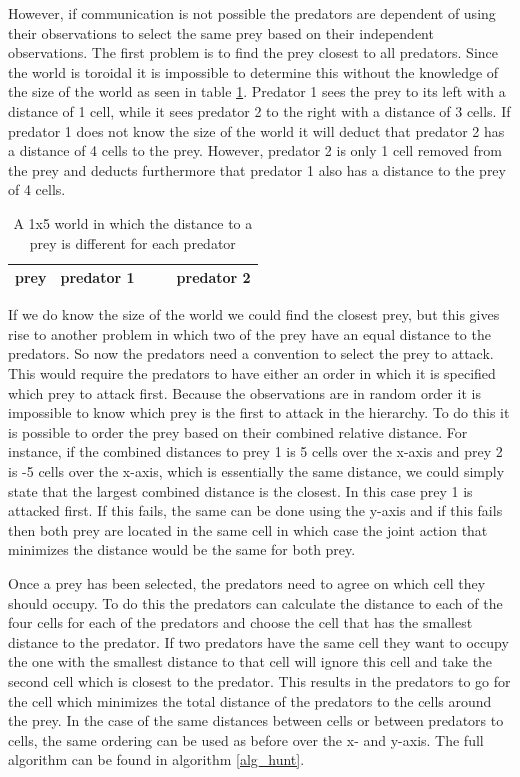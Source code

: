 \documentclass[10pt]{article}
\begin{document}
However, if communication is not possible the predators are dependent of using their observations to select the same prey based on their independent observations. The first problem is to find the prey closest to all predators. Since the world is toroidal it is impossible to determine this without the knowledge of the size of the world as seen in table \ref{tab_disprob}. Predator 1 sees the prey to its left with a distance of 1 cell, while it sees predator 2 to the right with a distance of 3 cells. If predator 1 does not know the size of the world it will deduct that predator 2 has a distance of 4 cells to the prey. However, predator 2 is only 1 cell removed from the prey and deducts furthermore that predator 1 also has a distance to the prey of 4 cells.

\begin{table}[h!tb]
\centering
	\caption{A 1x5 world in which the distance to a prey is different for each predator}
\label{tab_disprob}
\begin{tabular}{|c|c|c|c|c|}
\hline
	prey & predator 1& & &predator 2 \\
\hline
\end{tabular}
\end{table}

If we do know the size of the world we could find the closest prey, but this gives rise to another problem in which two of the prey have an equal distance to the predators. So now the predators need a convention to select the prey to attack. This would require the predators to have either an order in which it is specified which prey to attack first. Because the observations are in random order it is impossible to know which prey is the first to attack in the hierarchy. To do this it is possible to order the prey based on their combined relative distance. For instance, if the combined distances to prey 1 is 5 cells over the x-axis and prey 2 is -5 cells over the x-axis, which is essentially the same distance, we could simply state that the largest combined distance is the closest. In this case prey 1 is attacked first. If this fails, the same can be done using the y-axis and if this fails then both prey are located in the same cell in which case the joint action that minimizes the distance would be the same for both prey.

Once a prey has been selected, the predators need to agree on which cell they should occupy. To do this the predators can calculate the distance to each of the four cells for each of the predators and choose the cell that has the smallest distance to the predator. If two predators have the same cell they want to occupy the one with the smallest distance to that cell will ignore this cell and take the second cell which is closest to the predator. This results in the predators to go for the cell which minimizes the total distance of the predators to the cells around the prey. In the case of the same distances between cells or between predators to cells, the same ordering can be used as before over the x- and y-axis. The full algorithm can be found in algorithm \ref{alg_hunt}.
\end{document}
